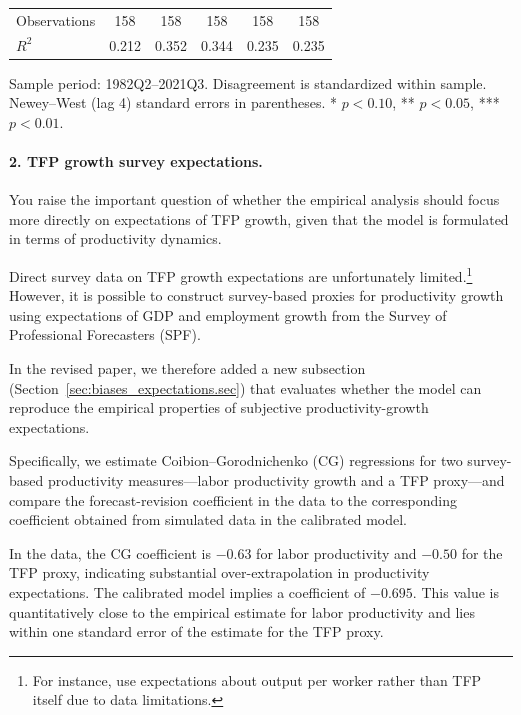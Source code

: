 \documentclass[12pt,a4paper]{article}
\begin{document}
\begin{table}[!t]
{\begin{tabular}{lccccc}
    \hline
    Observations & 158 & 158 & 158 & 158 & 158 \\
    $R^2$ & 0.212 & 0.352 & 0.344 & 0.235 & 0.235 \\
    \hline\hline
    \end{tabular}%
    }
    
    \vspace{0.2em}
    {\begin{flushleft}
        \footnotesize
        Sample period: 1982Q2--2021Q3. Disagreement is standardized within sample.
        Newey--West (lag 4) standard errors in parentheses.
        * $p<0.10$, ** $p<0.05$, *** $p<0.01$.
        \end{flushleft}}
    
    
    \end{table}    

\paragraph{2. TFP growth survey expectations.}

You raise the important question of whether the empirical analysis should focus
more directly on expectations of TFP growth, given that the model is formulated
in terms of productivity dynamics.

Direct survey data on TFP growth expectations are unfortunately limited.\footnote{
For instance, \citet{edge2007learning} use expectations about output per worker rather than TFP itself due to data limitations.
}
However, it is possible to construct survey-based proxies for productivity growth
using expectations of GDP and employment growth from the Survey of Professional
Forecasters (SPF).

In the revised paper, we therefore added a new subsection
(Section~\ref{sec:biases_expectations.sec})
that evaluates whether the model can reproduce the empirical properties of
subjective productivity-growth expectations.

Specifically, we estimate Coibion--Gorodnichenko (CG) regressions for two survey-based
productivity measures—labor productivity growth and a TFP proxy—and compare the
forecast-revision coefficient in the data to the corresponding coefficient
obtained from simulated data in the calibrated model.

In the data, the CG coefficient is $-0.63$ for labor productivity
and $-0.50$ for the TFP proxy,
indicating substantial over-extrapolation in productivity expectations.
The calibrated model implies a coefficient of $-0.695$.
This value is quantitatively close to the empirical estimate for labor productivity
and lies within one standard error of the estimate for the TFP proxy.
\end{document}
